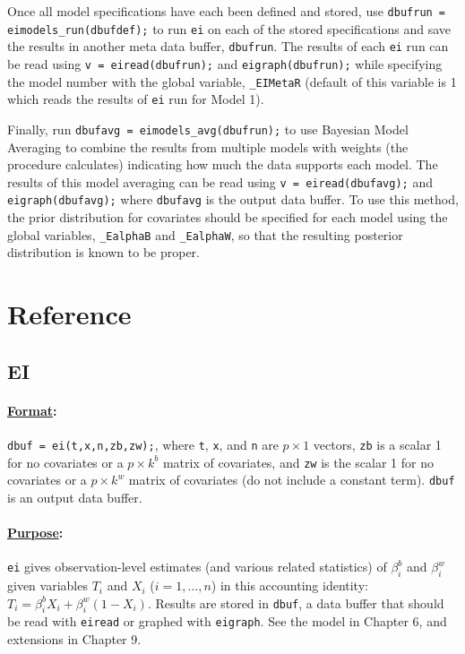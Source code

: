 \documentclass[11pt,titlepage]{article}
\begin{document}
Once all model specifications have each been defined and stored, use
\texttt{dbufrun = eimodels\_run(dbufdef);} to run \texttt{ei} on each
of the stored specifications and save the results in another meta data
buffer, \texttt{dbufrun}. The results of each \texttt{ei} run can be
read using \texttt{v = eiread(dbufrun);} and
\texttt{eigraph(dbufrun);} while specifying the model number with the
global variable, \texttt{\_EIMetaR} (default of this variable is 1
which reads the results of \texttt{ei} run for Model 1).

Finally, run \texttt{dbufavg = eimodels\_avg(dbufrun);} to use
Bayesian Model Averaging to combine the results from multiple models
with weights (the procedure calculates) indicating how much the data
supports each model.  The results of this model averaging can be read
using \texttt{v = eiread(dbufavg);} and \texttt{eigraph(dbufavg);}
where \texttt{dbufavg} is the output data buffer. To use this method,
the prior distribution for covariates should be specified for each
model using the global variables, \texttt{\_EalphaB} and
\texttt{\_EalphaW}, so that the resulting posterior distribution is
known to be proper.


\section{Reference}

\subsection{EI} \label{ei}

\paragraph{\underline{Format}:} \texttt{dbuf = ei(t,x,n,zb,zw);}, where
\texttt{t}, \texttt{x}, and \texttt{n} are $p\times 1$ vectors,
\texttt{zb} is a scalar 1 for no covariates or a $p\times k^b$ matrix
of covariates, and \texttt{zw} is the scalar 1 for no covariates or a
$p\times k^w$ matrix of covariates (do not include a constant term).
\texttt{dbuf} is an output data buffer.

\paragraph{\underline{Purpose}:}
\texttt{ei} gives observation-level estimates (and various related
statistics) of $\beta^b_i$ and $\beta_i^w$ given variables $T_i$ and
$X_i$ ($i=1,\dots,n$) in this accounting identity: $T_i = \beta^b_iX_i
+ \beta^w_i(1-X_i)$.  Results are stored in \texttt{dbuf}, a data
buffer that should be read with \texttt{eiread} or graphed with
\texttt{eigraph}.  See the model in Chapter 6, and extensions in
Chapter 9.
\end{document}
